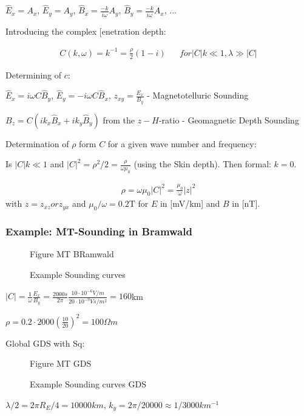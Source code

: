 $\hat{E}_x=A_x$, $\hat{E}_y=A_y$, $\hat{B}_x=\frac{-k}{i\omega}A_y$, $\hat{B}_y=\frac{-k}{i\omega}A_x$, ...

Introducing the complex [enetration depth:

\begin{align}
C(k,\omega)=k^{-1}=\frac{\rho}{2}(1-i) && for |C|k\ll 1, \lambda \gg |C|
\end{align}

Determining of $c$: 

$\hat{E}_x=i\omega C \hat{B}_y$, $\hat{E}_y=-i\omega C \hat{B}_x$, $z_{xy}=\frac{E_x}{B_y}$ - Magnetotelluric Sounding

$B_z=C (i k_x\hat{B}_x+i k_y\hat{B}_y)$ from the $z-H$-ratio - Geomagnetic Depth Sounding


Determination of $\rho$ form $C$ for a given wave number and frequency:

Is $|C|k\ll 1$ and $|C|^2=\rho^2/2=\frac{\rho}{\omega\mu_0}$ (using the Skin depth). Then formal: $k=0$.

\begin{align*}
\rho=\omega\mu_0|C|^2=\frac{\mu_0}{\omega}|z|^2
\end{align*}
with $z=z_{xz} or z_{yx}$ and $\mu_0/\omega=0.2$T for $E$ in [mV/km] and $B$ in [nT].

\subsubsection*{Example: MT-Sounding in Bramwald}

\begin{figure}[H]
\begin{center}
Figure MT BRamwald 
\caption{Example Sounding curves}
\label{fig:emexample01}
\end{center}
\end{figure}


$|C|=\frac{1}{\omega}\frac{E_x}{B_y}=\frac{2000s}{2\pi}\frac{10\cdot 10^{-6}V/m}{20\cdot 10^{-9}Vs/m^2}=160$km

$\rho=0.2\cdot 2000 \left(\frac{10}{20}\right)^2=100 \Omega m$


Global GDS with Sq:

\begin{figure}[H]
\begin{center}
Figure MT GDS
\caption{Example Sounding curves GDS}
\label{fig:emexample2}
\end{center}
\end{figure}

$\lambda/2=2\pi R_E/4=10000km$, $k_y=2\pi/20000\approx 1/3000 km^{-1}$

